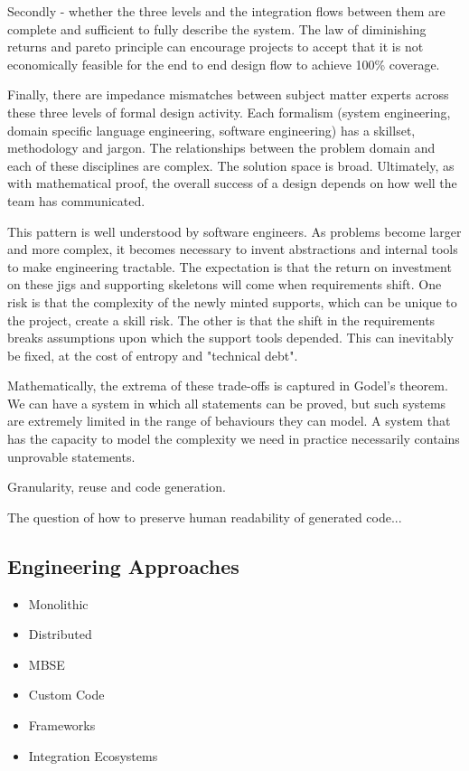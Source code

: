 \documentclass[5p]{elsarticle}
\begin{document}
Secondly - whether the three levels and the integration flows
between them are complete and sufficient to fully describe
the system.  The law of diminishing returns and pareto principle
can encourage projects to accept that it is not economically
feasible for the end to end design flow to achieve 100\%
coverage.

Finally, there are impedance mismatches between subject matter experts
across these three levels of formal design activity.  Each formalism
(system engineering, domain specific language engineering, software
engineering) has a skillset, methodology and jargon.  The relationships
between the problem domain and each of these disciplines are complex.
The solution space is broad. Ultimately, as with mathematical proof,
the overall success of a design depends on how well the team has
communicated.

This pattern is well understood by software engineers.  As problems
become larger and more complex, it becomes necessary to invent
abstractions and internal tools to make engineering tractable.
The expectation is that the return on investment on these jigs
and supporting skeletons will come when requirements shift.
One risk is that the complexity of the newly minted supports,
which can be unique to the project, create a skill risk.
The other is that the shift in the requirements breaks
assumptions upon which the support tools depended.  This 
can inevitably be fixed, at the cost of entropy and
"technical debt".  

Mathematically, the extrema of these trade-offs is captured
in Godel's theorem.  We can have a system in which all statements
can be proved, but such systems are extremely limited in the
range of behaviours they can model.  A system that has the capacity
to model the complexity we need in practice necessarily 
contains unprovable statements.



Granularity, reuse and code generation.

The question of how to preserve human readability of generated code...

\subsection{Engineering Approaches}

\begin{itemize}
\item{Monolithic}
\item{Distributed}
\item{MBSE}
\item{Custom Code}
\item{Frameworks}
\item{Integration Ecosystems}
\end{itemize}
\end{document}
